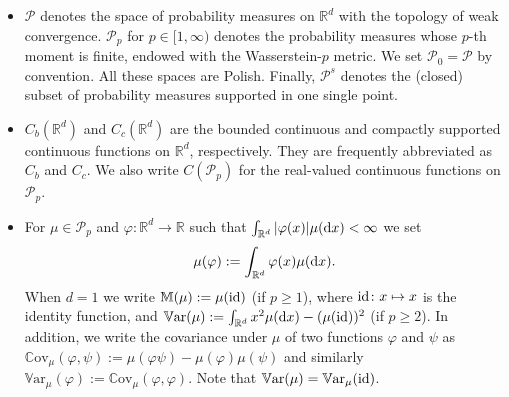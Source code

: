 \documentclass{article}
\theoremstyle{definition}
\numberwithin{equation}{section}
\numberwithin{theorem}{section}
\newcommand{\R}{\mathbb{R}}
\newcommand{\dx}{\mathrm{d}x}
\newcommand{\Mb}{\mathbb{M}}
\def\comment#1{\marginpar{\raggedright\scriptsize{\textcolor{red}{#1}}}}
\newcommand{\Cov}{\mathbb{C}\mathrm{ov}}
\newcommand{\Var}{\mathbb{V}\mathrm{ar}}
\renewcommand{\d}{{\rm d}}
\newcommand{\Pcal}{{\mathcal P}}
\newcommand{\id}{{\rm id}}
\begin{document}
\begin{itemize}
\item $\Pcal$ denotes the space of probability measures on $\R^d$ with the topology of weak convergence. $\Pcal_p$ for $p \in [1,\infty)$ denotes the probability measures whose $p$-th moment is finite, endowed with the Wasserstein-$p$ metric. We set $\Pcal_0 = \Pcal$ by convention. All these spaces are Polish. Finally, $\Pcal^s$ denotes the (closed) subset of probability measures supported in one single point.
\item $C_b(\R^d)$ and $C_c(\R^d)$ are the bounded continuous and compactly supported continuous functions on $\R^d$, respectively. They are frequently abbreviated as $C_b$ and $C_c$. We also write $C(\Pcal_p)$ for the real-valued continuous functions on $\Pcal_p$.
\item %
For $\mu\in \Pcal_p$ and $\varphi:\R^d\to \R$ such that $\int_{\R^d}|\varphi(x)| \mu(\d x)<\infty$ we set 
$$\mu(\varphi):=\int_{\R^d} \varphi(x) \mu(\d x).$$
When $d = 1$ we write $\Mb(\mu):=\mu(\id)$ (if $p \ge 1$), where $\id \colon x \mapsto x$ is the identity function, and $\Var(\mu) := \int_{\R^d} x^2 \mu(\dx) - (\mu(\id))^2$ (if $p \ge 2$). In addition, we write the covariance under $\mu$ of two functions $\varphi$ and $\psi$ as $\Cov_\mu(\varphi,\psi) := \mu(\varphi \psi) - \mu(\varphi) \mu(\psi)$ and similarly $\Var_\mu(\varphi) := \Cov_\mu(\varphi,\varphi)$. Note that $\Var(\mu) = \Var_\mu(\id)$.
\end{itemize}
\end{document}
